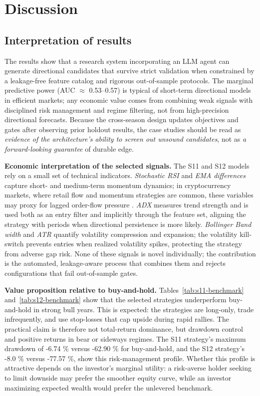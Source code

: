 \documentclass[11pt,a4paper]{article}
\begin{document}
\section{Discussion}\label{discussion}

\subsection{Interpretation of results}\label{interpretation-of-results}

The results show that a research system incorporating an LLM agent can generate directional candidates that survive strict validation when constrained by a leakage-free feature catalog and rigorous out-of-sample protocols. The marginal predictive power (AUC $\approx$ 0.53--0.57) is typical of short-term directional models in efficient markets; any economic value comes from combining weak signals with disciplined risk management and regime filtering, not from high-precision directional forecasts. Because the cross-season design updates objectives and gates after observing prior holdout results, the case studies should be read as \emph{evidence of the architecture's ability to screen out unsound candidates}, not as \emph{a forward-looking guarantee} of durable edge.

\textbf{Economic interpretation of the selected signals.} The S11 and S12 models rely on a small set of technical indicators. \emph{Stochastic RSI} and \emph{EMA differences} capture short- and medium-term momentum dynamics; in cryptocurrency markets, where retail flow and momentum strategies are common, these variables may proxy for lagged order-flow pressure \citep{sobreiro_2026}. \emph{ADX} measures trend strength and is used both as an entry filter and implicitly through the feature set, aligning the strategy with periods when directional persistence is more likely. \emph{Bollinger Band width} and \emph{ATR} quantify volatility compression and expansion; the volatility kill-switch prevents entries when realized volatility spikes, protecting the strategy from adverse gap risk. None of these signals is novel individually; the contribution is the automated, leakage-aware process that combines them and rejects configurations that fail out-of-sample gates.

\textbf{Value proposition relative to buy-and-hold.} Tables~\ref{tab:s11-benchmark} and~\ref{tab:s12-benchmark} show that the selected strategies underperform buy-and-hold in strong bull years. This is expected: the strategies are long-only, trade infrequently, and use stop-losses that cap upside during rapid rallies. The practical claim is therefore not total-return dominance, but drawdown control and positive returns in bear or sideways regimes. The S11 strategy's maximum drawdown of -6.74 \% versus -62.90 \% for buy-and-hold, and the S12 strategy's -8.0 \% versus -77.57 \%, show this risk-management profile. Whether this profile is attractive depends on the investor's marginal utility: a risk-averse holder seeking to limit downside may prefer the smoother equity curve, while an investor maximizing expected wealth would prefer the unlevered benchmark.
\end{document}
